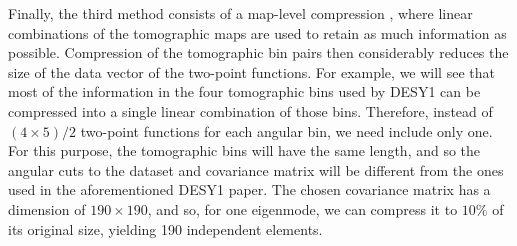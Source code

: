 \documentclass[twocolumn]{\docclass}
\newcommand{\rsec}[1]{\S\ref{sec:#1}}
\newcommand\scott[1]{{\bf [Scott: #1]}}
\begin{document}
	Finally, the third method consists of a map-level compression \citep{Alonso:2017hhj}, where linear combinations of the tomographic maps are used to retain as much information as possible. Compression of the tomographic bin pairs then considerably reduces the size of the data vector of the two-point functions. For example, we will see that most of the information in the four tomographic bins used by DESY1 can be compressed into a single linear combination of those bins. Therefore, instead of $(4\times5)/2$ two-point functions for each angular bin, we need include only one. %
	For this purpose, the tomographic bins will have the same length, and so the angular cuts to the dataset and covariance matrix will be different from the ones used in the aforementioned DESY1 paper. The chosen covariance matrix has a dimension of $190 \times 190$, and so, for one eigenmode, we can compress it to $10\%$ of its original size, yielding 190 independent elements.
	
	
	
\end{document}
